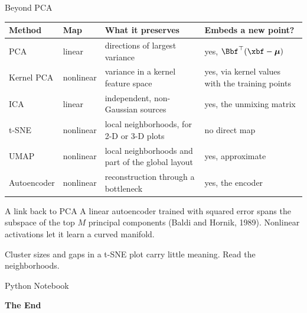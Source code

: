 \documentclass[aspectratio=169,xcolor=dvipsnames,svgnames,x11names,fleqn]{beamer}
\begin{document}
\begin{frame}{Beyond PCA}
    \footnotesize
    \renewcommand{\arraystretch}{1.3}
    \begin{center}
    \begin{tabular}{l|l|>{\raggedright\arraybackslash}p{5.2cm}|>{\raggedright\arraybackslash}p{4.4cm}}
        Method & Map & What it preserves & Embeds a new point? \\ \hline
        PCA & linear & directions of largest variance & yes, $\Bbf^\top(\xbf - \boldsymbol{\mu})$ \\
        Kernel PCA & nonlinear & variance in a kernel feature space & yes, via kernel values with the training points \\
        ICA & linear & independent, non-Gaussian sources & yes, the unmixing matrix \\
        t-SNE & nonlinear & local neighborhoods, for 2-D or 3-D plots & no direct map \\
        UMAP & nonlinear & local neighborhoods and part of the global layout & yes, approximate \\
        Autoencoder & nonlinear & reconstruction through a bottleneck & yes, the encoder \\
    \end{tabular}
    \end{center}
    \begin{tblock}{A link back to PCA}
        A linear autoencoder trained with squared error spans the subspace of the top $M$ principal components (Baldi and Hornik, 1989). Nonlinear activations let it learn a curved manifold.
    \end{tblock}
    Cluster sizes and gaps in a t-SNE plot carry little meaning. Read the neighborhoods.
\end{frame}


    
    \begin{frame}[containsverbatim]{Python Notebook}
    \begin{center}
    \small
    { }
    \end{center}
    \end{frame}
    
    
    \begin{frame}
        \Huge{\centerline{\color{MediumBlue}\textbf{The End}}}
    \end{frame}
\end{document}
